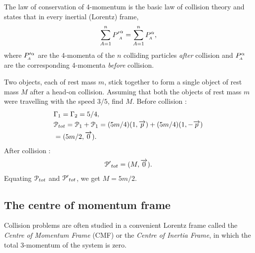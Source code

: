 The law of conservation of 4-momentum is the basic law 
of
collision theory and states that in every inertial 
(Lorentz)
frame,
\begin{align}\label{pm56}
\sum_{A=1}^n {P'}^{{\alpha}}_{_{\hspace*{-1.5pt}{A}}}=\sum_{A=1}^n
P_{_{\hspace*{-1.5pt}{A}}}^{{\alpha}},
\end{align}
where  ${P}'^{{\alpha}}_{_{\hspace*{-1.5pt}{A}}}$ are the 4-momenta of the 
$n$ 
colliding particles \textsl{after}  collision and 
$P_{_{\hspace*{-1.5pt}{A}}}^{{\alpha}}$ are the corresponding 4-momenta 
\textsl{before} collision.

\exm  Two objects, each of rest mass $ m $, stick 
together 
to form a single object of rest mass $M$ after a 
head-on 
collision. Assuming that both the objects of rest mass 
$m$ 
were travelling with the speed $3/5$, find $M$.
\soln
{Before collision }:
\begin{align}\label{pm66}
& \Gamma_1=\Gamma_2=5/4, \notag \\
&\EuScript{P}_{tot}=\EuScript{P}_1+\EuScript{P}_1
=(5m/4) (1, \overrightarrow{p})+
(5m/4) (1, -\overrightarrow{p})\notag \\&=(5m/2, \overrightarrow{0}).
\end{align}
{After collision }:
\begin{align}\label{pm67}
{\EuScript{P}'}_{tot}=(M,\overrightarrow{0}).
\end{align}
Equating $\EuScript{P}_{tot}$ and $ 
{\EuScript{P}'}_{tot}$, 
we get $ M=5m/2 $.  \ebx

\subsection{The centre of momentum frame}
Collision problems are often studied in a convenient 
Lorentz frame called the \textsl{Centre of Momentum 
Frame} (CMF) or the \textsl{Centre of Inertia Frame}, 
in which the total  3-momentum of the system is zero.

